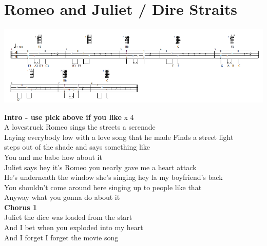 \section{Romeo and Juliet / Dire Straits}\label{sec:romeoandjuliet}

\includegraphics[scale=.6]{songs/r/romeojuliettab.png}
  
  \Fmajor
  \Cmajor
  \BflatMajor
  \Dminor
  
 
\textbf{Intro - use pick above if you like}      x 4\\
  A lovestruck Romeo  sings the streets a serenade  \\
  Laying everybody low   with a love song  that he made  Finds a street light \\
  steps out of the  shade and says something like\\
  You and me babe how about it\\
  Juliet says hey it's Romeo   you nearly gave me a heart attack   \\
  He's underneath the window  she's singing  hey la my  boyfriend’s back \\
  You shouldn't come around here   singing up to people like  that \\
  Anyway what you gonna do about it\\
 \textbf{Chorus 1}  \\
 Juliet  the dice was  loaded from the  start \\
  And I  bet  when you exploded into my  heart\\
 And  I forget I  forget  the movie  song\\
